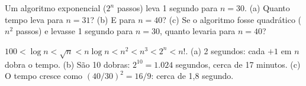 \begin{exrapido}
Um algoritmo exponencial ($2^n$ passos) leva 1 segundo para $n = 30$. (a) Quanto tempo leva para
$n = 31$? (b) E para $n = 40$? (c) Se o algoritmo fosse quadrático ($n^2$ passos) e levasse
1 segundo para $n = 30$, quanto levaria para $n = 40$?
\end{exrapido}

\begin{respostas}
   $100 < \log n < \sqrt{n} < n \log n < n^2 < n^3 < 2^n < n!$.
   (a) 2 segundos: cada $+1$ em $n$ dobra o tempo. (b) São 10 dobras:
  $2^{10} = 1.024$ segundos, cerca de 17 minutos. (c) O tempo cresce como $(40/30)^2 = 16/9$:
  cerca de 1,8 segundo.
\end{respostas}
